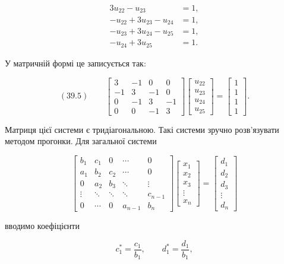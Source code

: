 \documentclass[
  ukrainian,
]{article}
\begin{document}
\[
\begin{aligned}3u_{22}-u_{23} &= 1,\\-u_{22}+3u_{23}-u_{24} &= 1,\\-u_{23}+3u_{24}-u_{25} &= 1,\\-u_{24}+3u_{25} &= 1.\end{aligned}
\]

У матричній формі це записується так:

\[
(39.5)\qquad\begin{bmatrix}3 & -1 & 0 & 0\\-1 & 3 & -1 & 0\\0 & -1 & 3 & -1\\0 & 0 & -1 & 3\end{bmatrix}\begin{bmatrix}u_{22}\\u_{23}\\u_{24}\\u_{25}\end{bmatrix}=\begin{bmatrix}1\\1\\1\\1\end{bmatrix}.
\]

Матриця цієї системи є тридіагональною. Такі системи зручно розв'язувати
методом прогонки. Для загальної системи

\[
\begin{bmatrix}b_1 & c_1 & 0 & \cdots & 0\\a_1 & b_2 & c_2 & \cdots & 0\\0 & a_2 & b_3 & \ddots & \vdots\\\vdots & \ddots & \ddots & \ddots & c_{n-1}\\0 & \cdots & 0 & a_{n-1} & b_n\end{bmatrix}\begin{bmatrix}x_1\\x_2\\x_3\\\vdots\\x_n\end{bmatrix}=\begin{bmatrix}d_1\\d_2\\d_3\\\vdots\\d_n\end{bmatrix}
\]

вводимо коефіцієнти

\[
c_1^*=\frac{c_1}{b_1},\qquad d_1^*=\frac{d_1}{b_1},
\]
\end{document}
